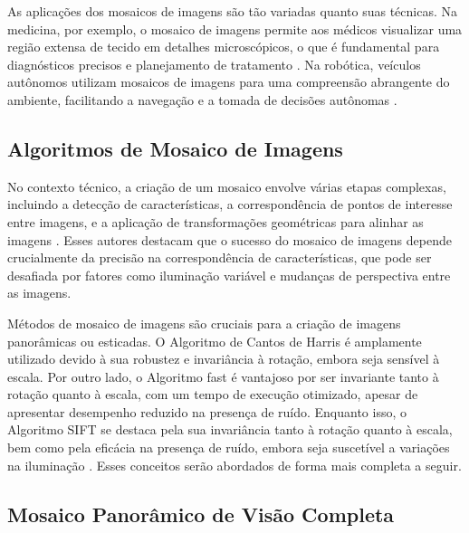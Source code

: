 As aplicações dos mosaicos de imagens são tão variadas quanto suas técnicas. Na medicina, por exemplo, o mosaico de imagens permite aos médicos visualizar uma região extensa de tecido em detalhes microscópicos, o que é fundamental para diagnósticos precisos e planejamento de tratamento \cite{Zitova2003}. Na robótica, veículos autônomos utilizam mosaicos de imagens para uma compreensão abrangente do ambiente, facilitando a navegação e a tomada de decisões autônomas \cite{Scaramuzza2011}.

\subsection{Algoritmos de Mosaico de Imagens}\label{sec:algoritmosmosaico}

No contexto técnico, a criação de um mosaico envolve várias etapas complexas, incluindo a detecção de características, a correspondência de pontos de interesse entre imagens, e a aplicação de transformações geométricas para alinhar as imagens \cite{BrownLowe2007}. Esses autores destacam que o sucesso do mosaico de imagens depende crucialmente da precisão na correspondência de características, que pode ser desafiada por fatores como iluminação variável e mudanças de perspectiva entre as imagens.

Métodos de mosaico de imagens são cruciais para a criação de imagens panorâmicas ou esticadas. O Algoritmo de Cantos de Harris é amplamente utilizado devido à sua robustez e invariância à rotação, embora seja sensível à escala. Por outro lado, o Algoritmo \gls{fast} é vantajoso por ser invariante tanto à rotação quanto à escala, com um tempo de execução otimizado, apesar de apresentar desempenho reduzido na presença de ruído. Enquanto isso, o Algoritmo SIFT se destaca pela sua invariância tanto à rotação quanto à escala, bem como pela eficácia na presença de ruído, embora seja suscetível a variações na iluminação \cite{vaghela2014review}. Esses conceitos serão abordados de forma mais completa a seguir.

\subsection{Mosaico Panorâmico de Visão Completa}\label{sec:mosaicocompleto}

